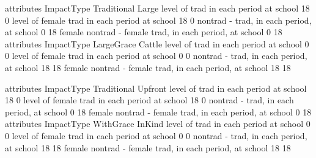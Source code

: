 \begin{Schunk}
\begin{Soutput}
                                                         attributes
ImpactType                                                Traditional Large
  level of trad in each period at school                           18     0
  level of female trad in each period at school                    18     0
  nontrad - trad, in each period, at school                         0    18
  female nontrad - female trad, in each period, at school           0    18
                                                         attributes
ImpactType                                                LargeGrace Cattle
  level of trad in each period at school                           0      0
  level of female trad in each period at school                    0      0
  nontrad - trad, in each period, at school                       18     18
  female nontrad - female trad, in each period, at school         18     18
\end{Soutput}
\end{Schunk}
\begin{Schunk}
\begin{Soutput}
                                                         attributes
ImpactType                                                Traditional Upfront
  level of trad in each period at school                           18       0
  level of female trad in each period at school                    18       0
  nontrad - trad, in each period, at school                         0      18
  female nontrad - female trad, in each period, at school           0      18
                                                         attributes
ImpactType                                                WithGrace InKind
  level of trad in each period at school                          0      0
  level of female trad in each period at school                   0      0
  nontrad - trad, in each period, at school                      18     18
  female nontrad - female trad, in each period, at school        18     18
\end{Soutput}
\end{Schunk}
